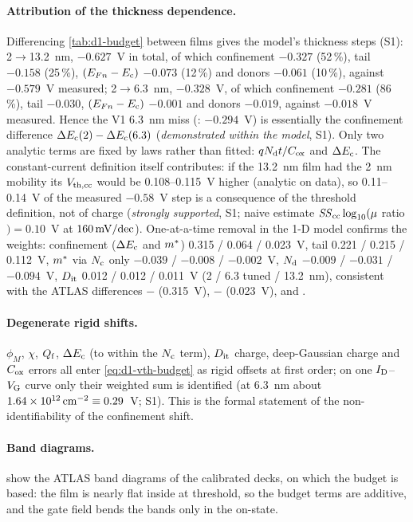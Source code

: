 \paragraph{Attribution of the thickness dependence.}
Differencing \cref{tab:d1-budget} between films gives the model's thickness steps (S1): 2$\rightarrow$13.2~nm,
$-0.627$~V in total, of which confinement $-0.327$ (52\,\%), tail $-0.158$ (25\,\%), $(E_{Fn}-E_{\mathrm{c}})$ $-0.073$ (12\,\%) and
donors $-0.061$ (10\,\%), against $-0.579$~V measured; 2$\rightarrow$6.3~nm, $-0.328$~V, of which confinement $-0.281$
(86\,\%), tail $-0.030$, $(E_{Fn}-E_{\mathrm{c}})$ $-0.001$ and donors $-0.019$, against $-0.018$~V measured. Hence the V1 6.3~nm
miss (: $-0.294$~V) is essentially the confinement difference $\Delta E_{\mathrm{c}}(2)-\Delta E_{\mathrm{c}}(6.3)$ (\emph{demonstrated within
the model}, S1). Only two analytic terms are fixed by laws rather than fitted: $qN_{\mathrm{d}} t/C_{\mathrm{ox}}$ and $\Delta E_{\mathrm{c}}$. The
constant-current definition itself contributes: if the 13.2~nm film had the 2~nm mobility its $V_{\mathrm{th,cc}}$ would be
0.108--0.115~V higher (analytic on data), so 0.11--0.14~V of the measured $-0.58$~V step is a consequence of the
threshold definition, not of charge (\emph{strongly supported}, S1; naive estimate $\mathit{SS}_{\mathrm{cc}}\log_{10}(\mu$ ratio$) = 0.10$~V
at $160\,\mathrm{mV/dec}$). One-at-a-time removal in the 1-D model confirms the weights: confinement ($\Delta E_{\mathrm{c}}$ and $m^{*}$) 0.315 /
0.064 / 0.023~V, tail 0.221 / 0.215 / 0.112~V, $m^{*}$ via $N_{\mathrm{c}}$ only $-0.039$ / $-0.008$ / $-0.002$~V, $N_{\mathrm{d}}$ $-0.009$ /
$-0.031$ / $-0.094$~V, $D_{\mathrm{it}}$ 0.012 / 0.012 / 0.011~V (2 / 6.3 tuned / 13.2~nm), consistent with the ATLAS differences
$-$ (0.315~V), $-$ (0.023~V),  and .

\paragraph{Degenerate rigid shifts.}
$\phi_M$, $\chi$, $Q_{\mathrm{f}}$, $\Delta E_{\mathrm{c}}$ (to within the $N_{\mathrm{c}}$ term), $D_{\mathrm{it}}$ charge, deep-Gaussian charge and $C_{\mathrm{ox}}$ errors all enter
\cref{eq:d1-vth-budget} as rigid offsets at first order; on one $I_{\mathrm{D}}$--$V_{\mathrm{G}}$ curve only their weighted sum is identified
(at 6.3~nm about $1.64\times10^{12}\,\mathrm{cm}^{-2} \equiv 0.29$~V; S1). This is the formal statement of the non-identifiability of
the confinement shift.

\paragraph{Band diagrams.}
 show the ATLAS band diagrams of the calibrated
decks, on which the budget is based: the film is nearly flat inside at threshold, so the budget terms are additive, and
the gate field bends the bands only in the on-state.

